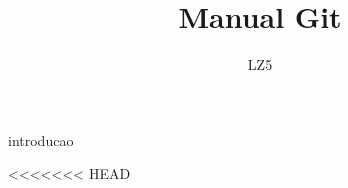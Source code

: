 \documentclass[a4paper,11pt]{article}
\title{Manual Git}
\author{LZ5}
\begin{document}
\maketitle
\newpage
\tableofcontents
\newpage
 {introducao}

<<<<<<< HEAD
\end{document}
